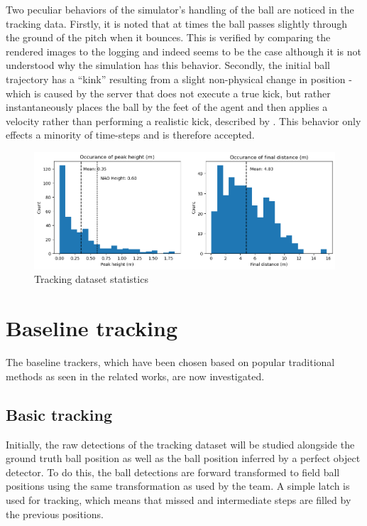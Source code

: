 \documentclass[a4paper,twoside,12pt]{report}
\begin{document}
Two peculiar behaviors of the simulator's handling of the ball are noticed in the tracking data. Firstly, it is noted that at times the ball passes slightly through the ground of the pitch when it bounces. This is verified by comparing the rendered images to the logging and indeed seems to be the case although it is not understood why the simulation has this behavior. Secondly, the initial ball trajectory has a ``kink'' resulting from a slight non-physical change in position - which is caused by the server that does not execute a true kick, but rather instantaneously places the ball by the feet of the agent and then applies a velocity rather than performing a realistic kick, described by \cite{fatproxy}. This behavior only effects a minority of time-steps and is therefore accepted.

\begin{figure}[h!]
\begin{center}
\includegraphics[width=14cm]{images/trackingplot.png}
\caption{Tracking dataset statistics}
\label{fig:trackplot}
\end{center}
\end{figure}

\section{Baseline tracking}

The baseline trackers, which have been chosen based on popular traditional methods as seen in the related works, are now investigated.

\subsection{Basic tracking}

Initially, the raw detections of the tracking dataset will be studied alongside the ground truth ball position as well as the ball position inferred by a perfect object detector. To do this, the ball detections are forward transformed to field ball positions using the same transformation as used by the team. A simple latch is used for tracking, which means that missed and intermediate steps are filled by the previous positions.
\end{document}
